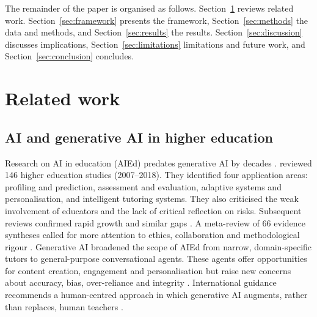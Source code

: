 \documentclass[preprint,12pt,authoryear]{elsarticle}
\theoremstyle{remark}
\begin{document}
The remainder of the paper is organised as follows. Section~\ref{sec:related} reviews related work. Section~\ref{sec:framework} presents the framework, Section~\ref{sec:methods} the data and methods, and Section~\ref{sec:results} the results. Section~\ref{sec:discussion} discusses implications, Section~\ref{sec:limitations} limitations and future work, and Section~\ref{sec:conclusion} concludes.

\section{Related work}
\label{sec:related}

\subsection{AI and generative AI in higher education}
Research on AI in education (AIEd) predates generative AI by decades \citep{luckin2016,holmes2019}. \citet{zawacki2019} reviewed 146 higher education studies (2007--2018). They identified four application areas: profiling and prediction, assessment and evaluation, adaptive systems and personalisation, and intelligent tutoring systems. They also criticised the weak involvement of educators and the lack of critical reflection on risks. Subsequent reviews confirmed rapid growth and similar gaps \citep{crompton2023}. A meta-review of 66 evidence syntheses called for more attention to ethics, collaboration and methodological rigour \citep{bond2024}. Generative AI broadened the scope of AIEd from narrow, domain-specific tutors to general-purpose conversational agents. These agents offer opportunities for content creation, engagement and personalisation but raise new concerns about accuracy, bias, over-reliance and integrity \citep{kasneci2023,dwivedi2023,rudolph2023,cotton2024}. International guidance recommends a human-centred approach in which generative AI augments, rather than replaces, human teachers \citep{unesco2023}.
\end{document}
